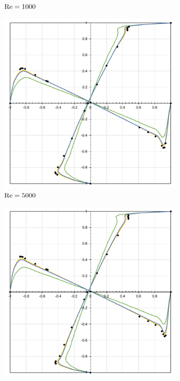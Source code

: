 \begin{figure}[h]
\begin{subfigure}{0.4\textwidth}
    \caption{$\mathrm{Re}=1000$}
    \end{subfigure}
    \begin{subfigure}{0.4\textwidth}
    \includegraphics[width=\linewidth]{Figuras/Cavity/Re5000.pdf}
    \caption{$\mathrm{Re}=5000$}
    \end{subfigure}
    \begin{subfigure}{0.4\textwidth}
    \includegraphics[width=\linewidth]{Figuras/Cavity/Re7500.pdf}

\end{subfigure}
\end{figure}
